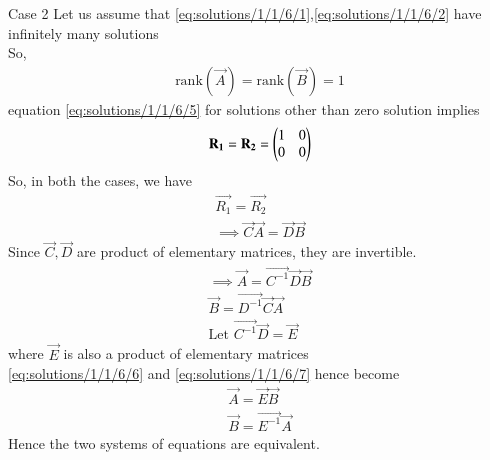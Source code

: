 {Case 2}
Let us assume that \eqref{eq:solutions/1/1/6/1},\eqref{eq:solutions/1/1/6/2} have infinitely many solutions\\
So,
\begin{align}
\text{rank}(\vec{A})= \text{rank}(\vec{B}) = 1
\end{align}
equation \eqref{eq:solutions/1/1/6/5} for solutions other than zero solution implies
\begin{align}
    \mathbf{R_1}=\mathbf{R_2}=\begin{pmatrix}1&0\\0&0\end{pmatrix}
\end{align}
So, in both the cases, we have 
\begin{align}
     \vec{R_1}=\vec{R_2}\\
     \implies \vec{C}\vec{A}=\vec{D}\vec{B}
\end{align}
Since $\vec{C},\vec{D}$ are product of elementary matrices, they are invertible.
\begin{align}
    \implies \vec{A}= \vec{C^{-1}}\vec{D}\vec{B}\label{eq:solutions/1/1/6/6}\\
    \vec{B}=\vec{D^{-1}}\vec{C}\vec{A}\label{eq:solutions/1/1/6/7}\\
    \text{Let } \vec{C^{-1}}\vec{D}=\vec{E}
\end{align}
where $\vec{E}$ is also a product of elementary matrices\\
\eqref{eq:solutions/1/1/6/6} and \eqref{eq:solutions/1/1/6/7} hence become
\begin{align}
\vec{A}=\vec{E}\vec{B}\\
\vec{B}=\vec{E^{-1}}\vec{A}
\end{align}
Hence the two systems of equations are equivalent.

